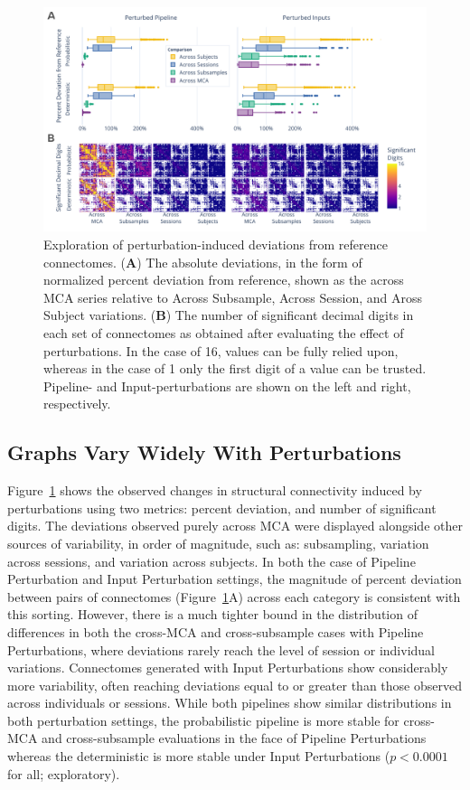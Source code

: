 \documentclass[fleqn,10pt]{SelfArx} %
\begin{document}
\begin{figure}[hbt]\centering
\includegraphics[width=\linewidth]{figures/fig1_absolute_differences.pdf}
\caption{Exploration of perturbation-induced deviations from reference connectomes.
(\textbf{A}) The absolute deviations, in the form of normalized percent deviation from reference, shown as the
across MCA series relative to Across Subsample, Across Session, and Aross Subject variations.
(\textbf{B}) The number of significant decimal digits in each set of connectomes as obtained after evaluating the
effect of perturbations. In the case of 16, values can be fully relied upon, whereas in the case of 1 only the first
digit of a value can be trusted. Pipeline- and Input-perturbations are shown on the left and right, respectively.}
\label{fig:absolute}
\end{figure}


\subsection*{Graphs Vary Widely With Perturbations}

Figure~\ref{fig:absolute} shows the observed changes in structural connectivity induced by perturbations using two
metrics: percent deviation, and number of significant digits. The deviations observed purely across MCA were displayed
alongside other sources of variability, in order of magnitude, such as: subsampling, variation across sessions, and
variation across subjects. In both the case of Pipeline Perturbation and Input Perturbation settings, the magnitude of
percent deviation between pairs of connectomes (Figure~\ref{fig:absolute}A) across each category is consistent with
this sorting. However, there is a much tighter bound in the distribution of differences in both the cross-MCA and
cross-subsample cases with Pipeline Perturbations, where deviations rarely reach the level of session or individual
variations. Connectomes generated with Input Perturbations show considerably more variability, often reaching
deviations equal to or greater than those observed across individuals or sessions. While both pipelines show similar
distributions in both perturbation settings, the probabilistic pipeline is more stable for cross-MCA and
cross-subsample evaluations in the face of Pipeline Perturbations whereas the deterministic is more stable under Input
Perturbations ($p < 0.0001$ for all; exploratory).
\end{document}
